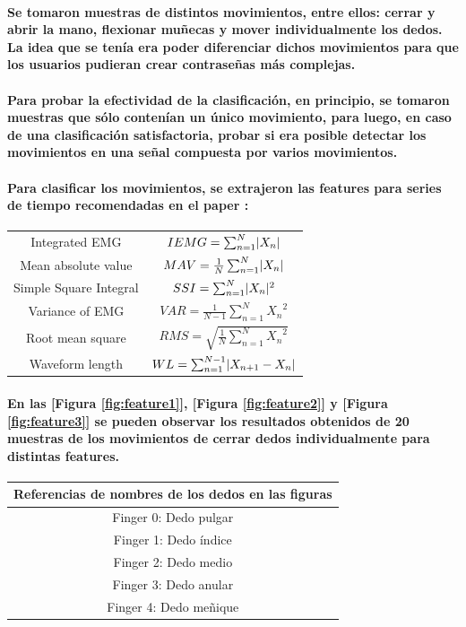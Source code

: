\documentclass{article}
\DeclarePairedDelimiter\abs{\lvert}{\rvert}%
\begin{document}
\paragraph{
Se tomaron muestras de distintos movimientos, entre ellos: cerrar y abrir la mano, flexionar muñecas y mover individualmente los dedos. La idea que se tenía era poder diferenciar dichos movimientos para que los usuarios pudieran crear contraseñas más complejas.
}
\paragraph{
Para probar la efectividad de la clasificación, en principio, se tomaron muestras que sólo contenían un único movimiento, para luego, en caso de una clasificación satisfactoria, probar si era posible detectar los movimientos en una señal compuesta por varios movimientos.
}
\paragraph{
Para clasificar los movimientos, se extrajeron las features para series de tiempo recomendadas en el paper \cite{angkoon2009}:
}

\begin{center}
\begin{tabular}{ c c }
 Integrated EMG & $IEMG = \sum_{n=1}^{N} \abs{X_n}$ \\
 Mean absolute value & $MAV = \frac{1}{N} \sum_{n=1}^{N} \abs{X_n}$ \\
 Simple Square Integral & $SSI = \sum_{n=1}^{N}\abs{X_n}^2$ \\
 Variance of EMG & $VAR = \frac{1}{N-1} \sum_{n=1}^{N} {X_n}^2$ \\
 Root mean square & $RMS = \sqrt{\frac{1}{N} \sum_{n=1}^{N} {X_n}^2}$ \\
 Waveform length & $WL = \sum_{n=1}^{N-1} \abs{X_{n + 1} - X_n}$
\end{tabular}
\end{center}

\paragraph{
En las [Figura \ref{fig:feature1}], [Figura \ref{fig:feature2}] y [Figura \ref{fig:feature3}] se pueden observar los resultados obtenidos de 20 muestras de los movimientos de cerrar dedos individualmente para distintas features.
}

\begin{center}
\begin{tabular}{ |c| }
\hline
    Referencias de nombres de los dedos en las figuras \\
\hline
    Finger 0: Dedo pulgar \\
    Finger 1: Dedo índice \\
    Finger 2: Dedo medio \\
    Finger 3: Dedo anular \\
    Finger 4: Dedo meñique \\
\hline
\end{tabular}
\end{center}
\end{document}
